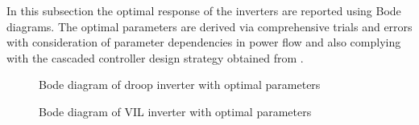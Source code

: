 In this subsection the optimal response of the inverters are reported using Bode diagrams. The optimal parameters are derived via comprehensive trials and errors with consideration of parameter dependencies in power flow and also complying with the cascaded controller design strategy obtained from \cite{ParamTune}.
\begin{figure}[ht]
    \centering
     \nonindent
	\caption[Bode diagram of droop inverter]{Bode diagram of droop inverter with optimal parameters}
	\label{res:Droopbode}
\end{figure}


\begin{figure}[ht]
    \centering
     \nonindent
	\caption[Bode Diagram of \gls{VIL} inverter]{Bode diagram of \gls{VIL} inverter with optimal parameters}
	\label{res:VILbode}
\end{figure}


